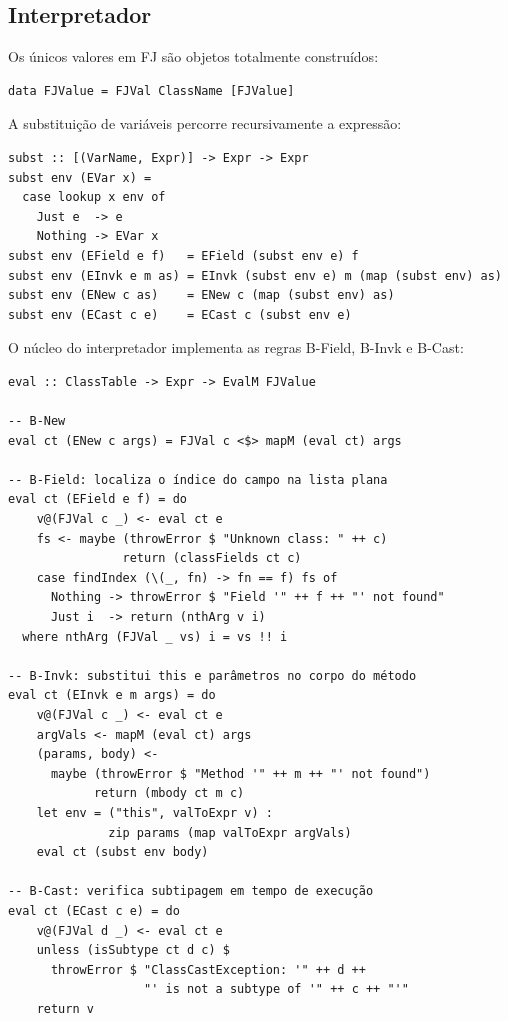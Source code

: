 \subsection{Interpretador}

Os únicos valores em FJ são objetos totalmente construídos:

\begin{verbatim}
data FJValue = FJVal ClassName [FJValue]
\end{verbatim}

A substituição de variáveis percorre recursivamente a expressão:

\begin{verbatim}
subst :: [(VarName, Expr)] -> Expr -> Expr
subst env (EVar x) =
  case lookup x env of
    Just e  -> e
    Nothing -> EVar x
subst env (EField e f)   = EField (subst env e) f
subst env (EInvk e m as) = EInvk (subst env e) m (map (subst env) as)
subst env (ENew c as)    = ENew c (map (subst env) as)
subst env (ECast c e)    = ECast c (subst env e)
\end{verbatim}

O núcleo do interpretador implementa as regras B-Field, B-Invk e B-Cast:

\begin{verbatim}
eval :: ClassTable -> Expr -> EvalM FJValue

-- B-New
eval ct (ENew c args) = FJVal c <$> mapM (eval ct) args

-- B-Field: localiza o índice do campo na lista plana
eval ct (EField e f) = do
    v@(FJVal c _) <- eval ct e
    fs <- maybe (throwError $ "Unknown class: " ++ c)
                return (classFields ct c)
    case findIndex (\(_, fn) -> fn == f) fs of
      Nothing -> throwError $ "Field '" ++ f ++ "' not found"
      Just i  -> return (nthArg v i)
  where nthArg (FJVal _ vs) i = vs !! i

-- B-Invk: substitui this e parâmetros no corpo do método
eval ct (EInvk e m args) = do
    v@(FJVal c _) <- eval ct e
    argVals <- mapM (eval ct) args
    (params, body) <-
      maybe (throwError $ "Method '" ++ m ++ "' not found")
            return (mbody ct m c)
    let env = ("this", valToExpr v) :
              zip params (map valToExpr argVals)
    eval ct (subst env body)

-- B-Cast: verifica subtipagem em tempo de execução
eval ct (ECast c e) = do
    v@(FJVal d _) <- eval ct e
    unless (isSubtype ct d c) $
      throwError $ "ClassCastException: '" ++ d ++
                   "' is not a subtype of '" ++ c ++ "'"
    return v
\end{verbatim}

